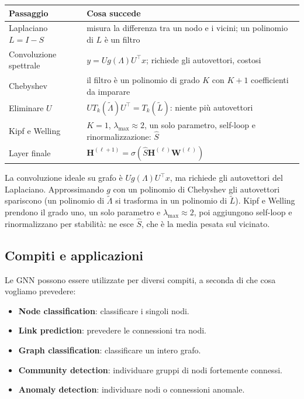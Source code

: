 \documentclass[11pt,a4paper]{article}
\begin{document}
\begin{center}
\renewcommand{\arraystretch}{1.35}
\begin{tabular}{|p{3.6cm}|p{10.6cm}|}
\hline
\textbf{Passaggio} & \textbf{Cosa succede} \\
\hline
Laplaciano $L=I-S$ & misura la differenza tra un nodo e i vicini; un polinomio di $L$ è un filtro \\
\hline
Convoluzione spettrale & $y=Ug(\Lambda)U^\top x$; richiede gli autovettori, costosi \\
\hline
Chebyshev & il filtro è un polinomio di grado $K$ con $K+1$ coefficienti da imparare \\
\hline
Eliminare $U$ & $UT_k(\widetilde\Lambda)U^\top=T_k(\widetilde L)$: niente più autovettori \\
\hline
Kipf e Welling & $K=1$, $\lambda_{\max}\approx2$, un solo parametro, self-loop e rinormalizzazione: $\hat{S}$ \\
\hline
Layer finale & $\mathbf{H}^{(\ell+1)}=\sigma(\hat{S}\mathbf{H}^{(\ell)}\mathbf{W}^{(\ell)})$ \\
\hline
\end{tabular}
\end{center}
 
\begin{importante}
La convoluzione ideale su grafo è $U g(\Lambda) U^\top x$, ma richiede gli
autovettori del Laplaciano. Approssimando $g$ con un polinomio di Chebyshev gli
autovettori spariscono (un polinomio di $\widetilde\Lambda$ si trasforma in un
polinomio di $\widetilde L$). Kipf e Welling prendono il grado uno, un solo
parametro e $\lambda_{\max}\approx2$, poi aggiungono self-loop e rinormalizzano
per stabilità: ne esce $\hat{S}$, che è la media pesata sul vicinato.
\end{importante}
 

\subsection{Compiti e applicazioni}


Le GNN possono essere utilizzate per diversi compiti, a seconda di
che cosa vogliamo prevedere:

\begin{itemize}
    \item \textbf{Node classification}: classificare i singoli nodi.
    \item \textbf{Link prediction}: prevedere le connessioni tra nodi.
    \item \textbf{Graph classification}: classificare un intero grafo.
    \item \textbf{Community detection}: individuare gruppi di nodi
    fortemente connessi.
    \item \textbf{Anomaly detection}: individuare nodi o connessioni
    anomale.
\end{itemize}
\end{document}
